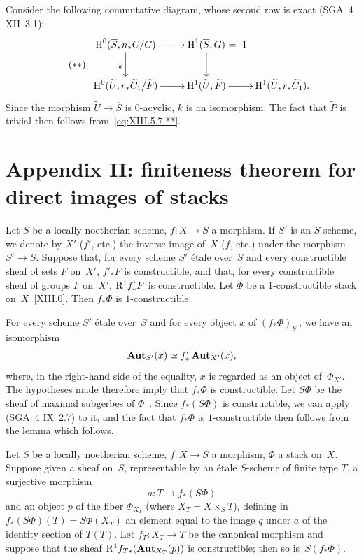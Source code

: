 Consider the following commutative diagram, whose second
row is exact (SGA~4 XII~3.1):
\begin{equation*}
\label{eq:XIII.5.7.**}
\tag{$**$}
\begin{array}{c}
\xymatrix{ \H^{0}(\overline{S},n_*C/G) \ar[r]
\ar[d]_{k} &\H^{1}(\overline{S},G)\rlap{$~=~1$} \ar[d] \cr
\H^{0}(\widetilde{U},r_*\widetilde{C}_{1}/\widetilde{F}) \ar[r]
&\H^{1}(\widetilde{U},\widetilde{F}) \ar[r]
&\H^{1}(\widetilde{U},r_*\widetilde{C}_{1}) \rlap{\quoi.} \cr }
\end{array}
\end{equation*}
Since the morphism $\widetilde{U}\to\overline{S}$ is $0$-acyclic,
$k$ is an isomorphism. The fact that $\widetilde{P}$ is trivial
then follows from~\eqref{eq:XIII.5.7.**}.

\section[Appendix II: finiteness for direct
images of stacks]{Appendix II: finiteness theorem for direct
images of stacks}
\label{XIII.6}

\begin{proposition}
\label{XIII.6.1}
Let $S$ be a locally noetherian scheme, $f\colon X\to S$
a morphism. If $S'$ is an $S$-scheme, we denote by $X'$
(\resp $f'$, etc.) the inverse image of~$X$ (\resp $f$, etc.) under the
morphism $S'\to S$. Suppose that, for every
scheme $S'$ \'etale over~$S$ and every constructible sheaf of sets
$F$ on~$X'$, $f'_*F$ is constructible, and that, for
every constructible sheaf of groups $F$ on~$X'$, $\mathrm{R}^{1}f'_*F$
is constructible. Let $\Phi$ be a $1$-constructible stack on~$X$~\eqref{XIII.0}. Then $f_*\Phi$ is $1$-constructible.
\end{proposition}

For every scheme $S'$ \'etale over~$S$ and for every object $x$ of
$(f_*\Phi)_{S'}$, we have an isomorphism
$$
\operatorname{\mathbf{Aut}}_{S'}(x)\simeq f'_*\operatorname{\mathbf{Aut}}_{X'}(x) ,
$$
where, in the right-hand side of the equality, $x$ is
regarded as an object of~$\Phi_{X'}$. The hypotheses
made therefore imply that $f_*\Phi$ is constructible.
Let $S\Phi$ be the sheaf of maximal subgerbes of
$\Phi$~\cite[III~2.1.7]{XIII.1}. Since $f_*(S\Phi)$ is constructible, we
can apply (SGA~4 IX~2.7) to it, and the fact that $f_*\Phi$ is
$1$-constructible then follows from the lemma which follows.

\begin{sublemma}
\label{XIII.6.1.1}
Let $S$ be a locally noetherian scheme, $f\colon X\to S$
a morphism, $\Phi$ a stack on~$X$. Suppose given a sheaf
on~$S$, representable by an \'etale $S$-scheme of finite
type $T$, a surjective morphism
$$
a\colon T\to f_*(S\Phi )
$$
and an object $p$ of the fiber $\Phi_{X_T}$ (where $X_T=X\times_ST$),
defining in $f_*(S\Phi )(T)=\allowbreak S\Phi (X_T)$ an element
equal to the image $q$ under $a$ of the identity section of
$T(T)$. Let $f_T\colon X_T\to T$ be the canonical morphism and suppose
that the sheaf $\mathrm{R}^1f_{T*}(\operatorname{\mathbf{Aut}}_{X_T}(p))$ is constructible;
then so is~$S(f_*\Phi )$.
\end{sublemma}


